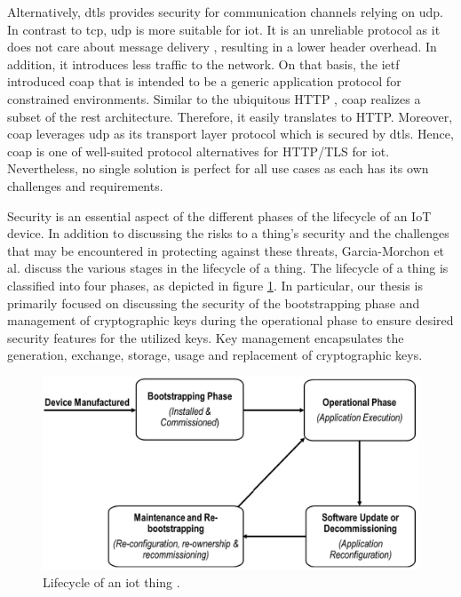 Alternatively, \gls{dtls} \cite{dtls} provides security for communication channels relying on \gls{udp}. In contrast to \gls{tcp}, \gls{udp} is more suitable for \gls{iot}. It is an unreliable protocol as it does not care about message delivery , resulting in a lower header overhead. In addition, it introduces less traffic to the network. On that basis, the \gls{ietf} introduced \gls{coap} \cite{rfc7252} that is intended to be a generic application protocol for constrained environments. Similar to the ubiquitous HTTP \cite{http}, \gls{coap} realizes a subset of the \gls{rest} architecture. Therefore, it easily translates to HTTP. Moreover, \gls{coap} leverages \gls{udp} as its transport layer protocol which is secured by \gls{dtls}. Hence, \gls{coap} is one of well-suited protocol alternatives for HTTP/TLS for \gls{iot}. Nevertheless, no single solution is perfect for all use cases as each has its own challenges and requirements.
\par
Security is an essential aspect of the different phases of the lifecycle of an IoT device. In addition to discussing the risks to a thing's security and the challenges that may be encountered in protecting against these threats, Garcia-Morchon et al. \cite{rfc8576} discuss the various stages in the lifecycle of a thing. The lifecycle of a thing is classified into four phases, as depicted in figure \ref{fig:iot-lifecycle}. In particular, our thesis is primarily focused on discussing the security of the bootstrapping phase and management of cryptographic keys during the operational phase to ensure desired security features for the utilized keys. Key management encapsulates the generation, exchange, storage, usage and replacement of cryptographic keys.
\begin{figure}[htbp]
	\centering
	\includegraphics[scale=0.35]{Images/iot-lifecycle.jpg}
	\caption{Lifecycle of an \gls{iot} thing \cite{bs-survey}.}
	\label{fig:iot-lifecycle}
\end{figure}

